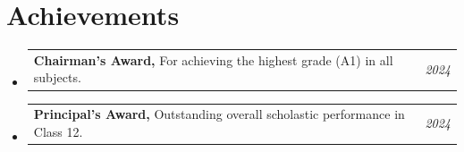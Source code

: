 \documentclass[a4paper,11pt]{article}
\makeatletter
\newcommand{\resumePOR}[3]{
\vspace{0.5mm}\item
    \begin{tabular*}{0.97\textwidth}[t]{l@{\extracolsep{\fill}}r}
        \textbf{#1}\hspace{0.3mm}#2 & \textit{\small{#3}} 
    \end{tabular*}
    \vspace{-2mm}
}
\newcommand{\resumeSubHeadingListStart}{\begin{itemize}[leftmargin=*,labelsep=0mm]}
\newcommand{\resumeSubHeadingListEnd}{\end{itemize}\vspace{2mm}}
\makeatother
\begin{document}
\section{\textbf{Achievements}}
\vspace{-0.4mm}
\resumeSubHeadingListStart
\resumePOR{Chairman's Award, }
    {For achieving the highest grade (A1) in all subjects.}
    {2024}

\resumePOR{Principal's Award, }
    {Outstanding overall scholastic performance in Class 12.}
    {2024}
\resumeSubHeadingListEnd
\vspace{-5mm}



\end{document}
